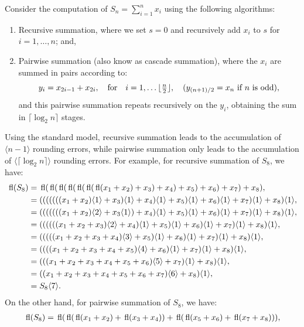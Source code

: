 \begin{example}
Consider the computation of $\displaystyle S_n = \sum_{i=1}^nx_i$ using the following algorithms:
\begin{enumerate}
\item Recursive summation, where we set $s=0$ and recursively add $x_i$ to $s$ for $i=1,\ldots,n$; and,
\item Pairwise summation (also know as cascade summation), where the $x_i$ are summed in pairs according to:
\[
y_i = x_{2i-1}+x_{2i},\quad{\rm for}\quad i=1,\ldots\lfloor\tfrac{n}{2}\rfloor,\quad (y_{(n+1)/2} = x_n\hbox{ if }n\hbox{ is odd}),
\]
and this pairwise summation repeats recursively on the $y_i$, obtaining the sum in $\lceil\log_2n\rceil$ stages.
\end{enumerate}
Using the standard model, recursive summation leads to the accumulation of $\langle n-1\rangle$ rounding errors, while pairwise summation only leads to the accumulation of $\langle \lceil\log_2 n\rceil\rangle$ rounding errors. For example, for recursive summation of $S_8$, we have:
\begin{align*}
{\rm\,fl}(S_8) & = {\rm\,fl}({\rm\,fl}({\rm\,fl}({\rm\,fl}({\rm\,fl}({\rm\,fl}({\rm\,fl}(x_1+x_2)+x_3)+x_4)+x_5)+x_6)+x_7)+x_8),\\
& = (((((((x_1+x_2)\langle1\rangle+x_3)\langle1\rangle+x_4)\langle1\rangle+x_5)\langle1\rangle+x_6)\langle1\rangle+x_7)\langle1\rangle+x_8)\langle1\rangle,\\
& = (((((((x_1+x_2)\langle2\rangle+x_3\langle1\rangle)+x_4)\langle1\rangle+x_5)\langle1\rangle+x_6)\langle1\rangle+x_7)\langle1\rangle+x_8)\langle1\rangle,\\
& = ((((((x_1+x_2+x_3)\langle2\rangle+x_4)\langle1\rangle+x_5)\langle1\rangle+x_6)\langle1\rangle+x_7)\langle1\rangle+x_8)\langle1\rangle,\\
& = (((((x_1+x_2+x_3+x_4)\langle3\rangle+x_5)\langle1\rangle+x_6)\langle1\rangle+x_7)\langle1\rangle+x_8)\langle1\rangle,\\
& = ((((x_1+x_2+x_3+x_4+x_5)\langle4\rangle+x_6)\langle1\rangle+x_7)\langle1\rangle+x_8)\langle1\rangle,\\
& = (((x_1+x_2+x_3+x_4+x_5+x_6)\langle5\rangle+x_7)\langle1\rangle+x_8)\langle1\rangle,\\
& = ((x_1+x_2+x_3+x_4+x_5+x_6+x_7)\langle6\rangle+x_8)\langle1\rangle,\\
& = S_8\langle7\rangle.
\end{align*}
On the other hand, for pairwise summation of $S_8$, we have:
\begin{align*}
\fl(S_8) & = \fl(\fl(\fl(x_1+x_2) + \fl(x_3+x_4)) + \fl(\fl(x_5+x_6) + \fl(x_7+x_8))),\\

\end{align*}
\end{example}

